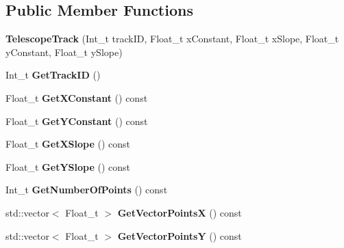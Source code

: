 \subsection*{Public Member Functions}
\begin{DoxyCompactItemize}
\item 
\mbox{\label{class_telescope_track_aa21071ed77d0b2bbf9d5bbc7b441afc4}} 
{\bfseries Telescope\+Track} (Int\+\_\+t track\+ID, Float\+\_\+t x\+Constant, Float\+\_\+t x\+Slope, Float\+\_\+t y\+Constant, Float\+\_\+t y\+Slope)
\item 
\mbox{\label{class_telescope_track_af278076d355dd07da9ecea8a1807e099}} 
Int\+\_\+t {\bfseries Get\+Track\+ID} ()
\item 
\mbox{\label{class_telescope_track_a6d131c17d16f466db7d4a53209b47569}} 
Float\+\_\+t {\bfseries Get\+X\+Constant} () const
\item 
\mbox{\label{class_telescope_track_ab4619449c0f1e1cdf1f52f37cc9d332f}} 
Float\+\_\+t {\bfseries Get\+Y\+Constant} () const
\item 
\mbox{\label{class_telescope_track_af3ca4b90a7261e3e1ed07d01bd51c7da}} 
Float\+\_\+t {\bfseries Get\+X\+Slope} () const
\item 
\mbox{\label{class_telescope_track_a3f150776a4329791920a795fb0ab0ac4}} 
Float\+\_\+t {\bfseries Get\+Y\+Slope} () const
\item 
\mbox{\label{class_telescope_track_ae0b86e4840ee2d648dd5e04dc69762d9}} 
Int\+\_\+t {\bfseries Get\+Number\+Of\+Points} () const
\item 
\mbox{\label{class_telescope_track_a59f26eee73595a0f034d063cd1c13171}} 
std\+::vector$<$ Float\+\_\+t $>$ {\bfseries Get\+Vector\+PointsX} () const
\item 
\mbox{\label{class_telescope_track_a52b7c3d8a0faf853465cbccbfc966447}} 
std\+::vector$<$ Float\+\_\+t $>$ {\bfseries Get\+Vector\+PointsY} () const
\item 

\end{DoxyCompactItemize}
